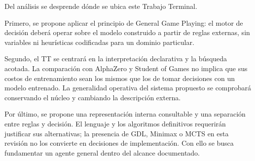 Del análisis se desprende dónde se ubica este Trabajo Terminal.

Primero, se propone aplicar el principio de General Game Playing: el motor de decisión deberá operar sobre el modelo construido a partir de reglas externas, sin variables ni heurísticas codificadas para un dominio particular.

Segundo, el TT se centrará en la interpretación declarativa y la búsqueda acotada. La comparación con AlphaZero y Student of Games no implica que sus costos de entrenamiento sean los mismos que los de tomar decisiones con un modelo entrenado. La generalidad operativa del sistema propuesto se comprobará conservando el núcleo y cambiando la descripción externa.

Por último, se propone una representación interna consultable y una separación entre reglas y decisión. El lenguaje y los algoritmos definitivos requerirán justificar sus alternativas; la presencia de GDL, Minimax o MCTS en esta revisión no los convierte en decisiones de implementación. Con ello se busca fundamentar un agente general dentro del alcance documentado.
